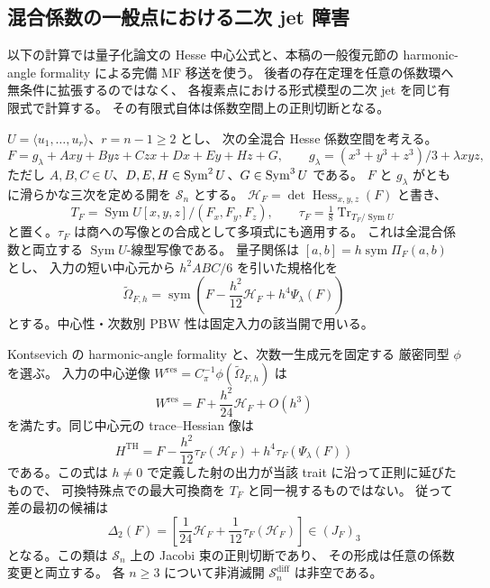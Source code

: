 \subsection{混合係数の一般点における二次 jet 障害}

以下の計算では量子化論文\cite{CubicQuantization}の Hesse 中心公式と、本稿の一般復元節の
harmonic-angle formality による完備 MF 移送を使う。
後者の存在定理を任意の係数環へ無条件に拡張するのではなく、
各複素点における形式模型の二次 jet を同じ有限式で計算する。
その有限式自体は係数空間上の正則切断となる。

$U=\langle u_1,\ldots,u_r\rangle$、$r=n-1\ge2$ とし、
次の全混合 Hesse 係数空間を考える。
\[
 F=g_\lambda+Axy+Byz+Czx+Dx+Ey+Hz+G,\qquad
 g_\lambda=(x^3+y^3+z^3)/3+\lambda xyz,
\]
ただし $A,B,C\in U$、$D,E,H\in\operatorname{Sym}^2U$、$G\in\operatorname{Sym}^3U$ である。
$F$ と $g_\lambda$ がともに滑らかな三次を定める開を $\mathcal S_n$ とする。
$\mathscr H_F=\det\operatorname{Hess}_{x,y,z}(F)$ と書き、
\[
 T_F=\operatorname{Sym}U[x,y,z]/(F_x,F_y,F_z),\qquad
 \tau_F=\tfrac18\operatorname{Tr}_{T_F/\operatorname{Sym}U}
\]
と置く。$\tau_F$ は商への写像との合成として多項式にも適用する。
これは全混合係数と両立する $\operatorname{Sym}U$-線型写像である。
量子関係は $[a,b]=h\operatorname{sym}\Pi_F(a,b)$ とし、
入力の短い中心元から $h^2ABC/6$ を引いた規格化を
\[
 \widetilde\Omega_{F,h}
 =\operatorname{sym}\left(F-\frac{h^2}{12}\mathscr H_F
                              +h^4\Psi_\lambda(F)\right)
\]
とする。中心性・次数別 PBW 性は固定入力の該当開で用いる。

\begin{proposition}
\label{prop:nfm-relative-residual-second-jet}
Kontsevich の harmonic-angle formality と、次数一生成元を固定する
厳密同型 $\phi$ を選ぶ。
入力の中心逆像 $W^{\mathrm{res}}=C_\pi^{-1}\phi(\widetilde\Omega_{F,h})$ は
\begin{equation}\label{eq:nfm-residual-universal-jet}
 W^{\mathrm{res}}=F+\frac{h^2}{24}\mathscr H_F+O(h^3)
\end{equation}
を満たす。同じ中心元の trace--Hessian 像は
\begin{equation}\label{eq:nfm-th-universal-jet}
 H^{\mathrm{TH}}
 =F-\frac{h^2}{12}\tau_F(\mathscr H_F)
      +h^4\tau_F(\Psi_\lambda(F))
\end{equation}
である。この式は $h\ne0$ で定義した射の出力が当該 trait に沿って正則に延びたもので、
可換特殊点での最大可換商を $T_F$ と同一視するものではない。
従って差の最初の候補は
\begin{equation}\label{eq:nfm-relative-comparison-class}
 \Delta_2(F)=
 \left[\frac1{24}\mathscr H_F+
             \frac1{12}\tau_F(\mathscr H_F)\right]
 \in (J_F)_3
\end{equation}
となる。この類は $\mathcal S_n$ 上の Jacobi 束の正則切断であり、
その形成は任意の係数変更と両立する。
各 $n\ge3$ について非消滅開 $\mathcal S_n^{\mathrm{diff}}$ は非空である。
\end{proposition}

